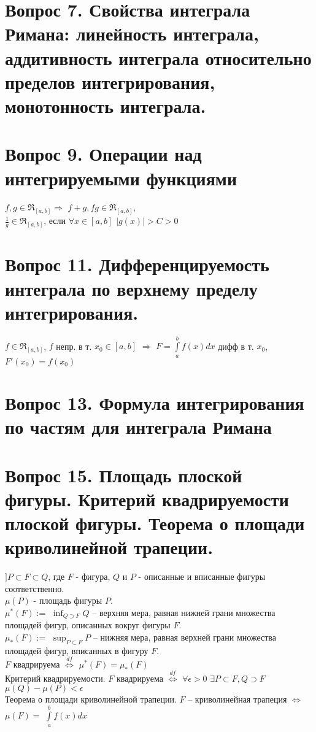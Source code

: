 \documentclass{article}
\begin{document}
\section{Вопрос 7. Свойства интеграла Римана: линейность интеграла, аддитивность интеграла относительно пределов интегрирования, монотонность интеграла.}

\section{Вопрос 9. Операции над интегрируемыми функциями}
$f, g \in \Re_{[a,b]} \Rightarrow$ $f+g, fg \in \Re_{[a,b]},$ \\
$\frac 1 g \in \Re_{[a,b]}$, если $\forall x \in [a,b]$ $|g(x)| > C > 0$

\section{Вопрос 11. Дифференцируемость интеграла по верхнему пределу интегрирования.}
$f \in \Re_{[a,b]}$, $f$ непр. в т. $x_0 \in [a,b]$ $\Rightarrow$ $F=\int\limits_a^b f(x)dx$ дифф в т. $x_0$, $F'(x_0) = f(x_0)$

\section{Вопрос 13. Формула интегрирования по частям для интеграла Римана}


\section{Вопрос 15. Площадь плоской фигуры. Критерий квадрируемости плоской фигуры. Теорема о площади криволинейной трапеции.}
$] P \subset F \subset Q$, где $F$ - фигура, $Q$ и $P$ - описанные и вписанные фигуры соответственно. \\
$\mu(P)$ - площадь фигуры $P$. \\
$\mu^*(F) :=$ $\displaystyle\inf_{Q \supset F}{Q}$ -- верхняя мера, равная нижней грани множества площадей фигур, описанных вокруг фигуры $F$. \\
$\mu_*(F) :=$ $\displaystyle\sup_{P \subset F}{P}$ -- нижняя мера, равная верхней грани множества площадей фигур, вписанных в фигуру $F$. \\
$F$ квадрируема $\overset{df}{\Leftrightarrow}$ $\mu^*(F) = \mu_*(F)$ \\
Критерий квадрируемости. $F$ квадрируема $\overset{df}{\Leftrightarrow}$ $\forall \epsilon > 0$ $\exists P \subset F, Q \supset F$ $\mu(Q) - \mu(P) < \epsilon$ \\
Теорема о площади криволинейной трапеции. $F$ -- криволинейная трапеция $\Leftrightarrow$ $\mu(F) =$ $\displaystyle\int\limits_a^b f(x)dx$
\end{document}
